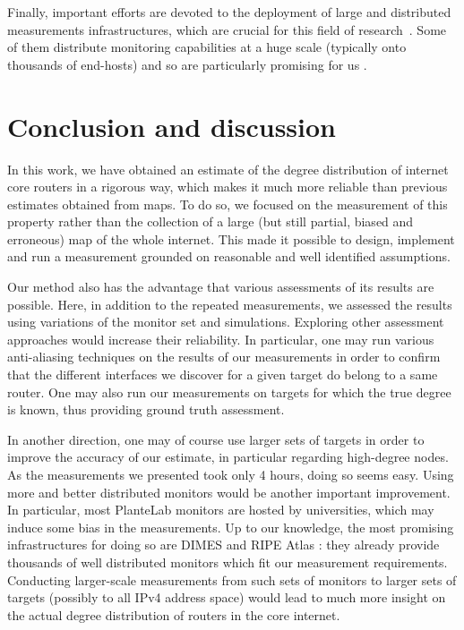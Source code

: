 \documentclass[conference]{IEEEtran}
\begin{document}
Finally, important efforts are devoted to the deployment of large and distributed measurements infrastructures, which are crucial for this field of research~\cite{caida,dimes,iplane,planetlab,ripeatlas}. Some of them distribute monitoring capabilities at a huge scale (typically onto thousands of end-hosts) and so are particularly promising for us \cite{ripeatlas,dimes}.

\section{Conclusion and discussion}
\label{sec:conclusion}

In this work, we have obtained an estimate of the degree distribution of internet core routers in a rigorous way, which makes it much more reliable than previous estimates obtained from maps. To do so, we focused on the measurement of this property rather than the collection of a large (but still partial, biased and erroneous) map of the whole internet. This made it possible to design, implement and run a measurement grounded on reasonable and well identified assumptions.

Our method also has the advantage that various assessments of its results are possible. Here, in addition to the repeated measurements, we assessed the results using variations of the monitor set and simulations. Exploring other assessment approaches would increase their reliability. In particular, one may run various anti-aliasing techniques on the results of our measurements in order to confirm that the different interfaces we discover for a given target do belong to a same router. One may also run our measurements on targets for which the true degree is known, thus providing ground truth assessment.

In another direction, one may of course use larger sets of targets in order to improve the accuracy of our estimate, in particular regarding high-degree nodes. As the measurements we presented took only 4 hours, doing so seems easy. Using more and better distributed monitors would be another important improvement. In particular, most PlanteLab monitors are hosted by universities, which may induce some bias in the measurements. Up to our knowledge, the most promising infrastructures for doing so are DIMES and RIPE Atlas \cite{dimes,ripeatlas}: they already provide thousands of well distributed monitors which fit our measurement requirements. Conducting larger-scale measurements from such sets of monitors to larger sets of targets (possibly to all IPv4 address space) would lead to much more insight on the actual degree distribution of routers in the core internet.
\end{document}
